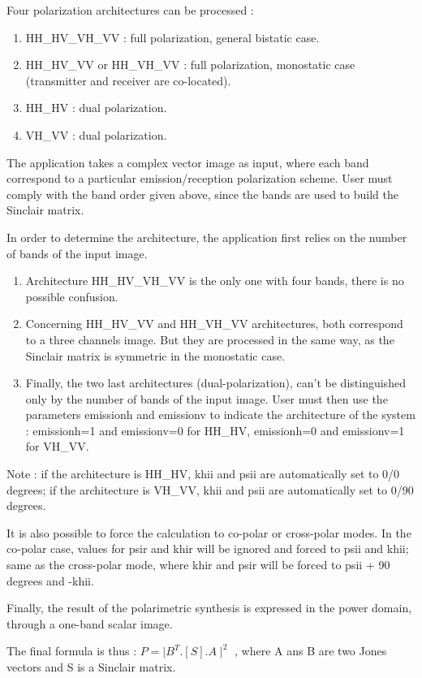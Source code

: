 Four polarization architectures can be processed :
\begin{enumerate}
\item HH\_HV\_VH\_VV : full polarization, general bistatic case.
\item HH\_HV\_VV or HH\_VH\_VV : full polarization, monostatic case (transmitter
and receiver are co-located).
\item HH\_HV : dual polarization.
\item VH\_VV : dual polarization.
\end{enumerate}
The application takes a complex vector image as input, where each band
correspond to a particular emission/reception polarization scheme.  User must
comply with the band order given above, since the bands are used to build the
Sinclair matrix.

In order to determine the architecture, the application first relies on the
number of bands of the input image.
\begin{enumerate}
\item Architecture HH\_HV\_VH\_VV is the only one with four bands, there is no
possible confusion.
\item Concerning HH\_HV\_VV and HH\_VH\_VV architectures, both correspond to a
three channels image. But they are processed in the same way, as the Sinclair
matrix is symmetric in the monostatic case.
\item Finally, the two last architectures (dual-polarization), can't be
distinguished only by the number of bands of the input image. User must then use
the parameters emissionh and emissionv to indicate the architecture of the
system : emissionh=1 and emissionv=0 for HH\_HV, emissionh=0 and emissionv=1 for
VH\_VV.
\end{enumerate}
Note : if the architecture is HH\_HV, khii and psii are automatically set to 0/0
degrees; if the architecture is VH\_VV, khii and psii are automatically set to
0/90 degrees.

It is also possible to force the calculation to co-polar or cross-polar modes.
In the co-polar case, values for psir and khir will be ignored and forced to
psii and khii; same as the cross-polar mode, where khir and psir will be forced
to psii + 90 degrees and -khii.

Finally, the result of the polarimetric synthesis is expressed in the power
domain, through a one-band scalar image.
 
The final formula is thus : $P=\mid B^T.[S].A\mid^2$ , where A ans B are two
Jones vectors and S is a Sinclair matrix.
 
